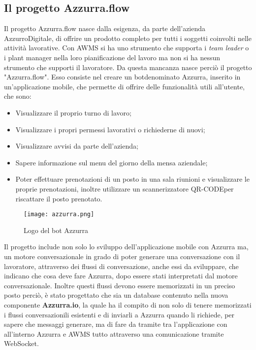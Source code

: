 \subsection{Il progetto Azzurra.flow}

Il progetto Azzurra.flow nasce dalla esigenza, da parte dell'azienda AzzurroDigitale, di offrire un prodotto completo per tutti i soggetti coinvolti nelle attività lavorative. Con \gls{AWMS} si ha uno strumento che supporta i \emph{team leader} o i \gls{plant manager} nella loro pianificazione del lavoro ma non si ha nessun strumento che supporti il lavoratore. Da questa mancanza nasce perciò il progetto "Azzurra.flow". Esso consiste nel creare un \gls{bot}\glsfirstoccur denominato Azzurra, inserito in un’applicazione mobile, che permette di offrire delle funzionalità utili all'utente, che sono:
\begin{itemize}
	\item Visualizzare il proprio turno di lavoro;
	\item Visualizzare i propri permessi lavorativi o richiederne di nuovi;
	\item Visualizzare avvisi da parte dell'azienda;
	\item Sapere informazione sul menu del giorno della mensa aziendale;
	\item Poter effettuare prenotazioni di un posto in una sala riunioni e visualizzare le proprie prenotazioni, inoltre utilizzare un scannerizzatore \gls{QR-CODE}\glsfirstoccur per riscattare il posto prenotato.
\end{itemize}
	\begin{figure}[!h] 
	\begin{center}
		\texttt{[image: azzurra.png]}
		\caption{Logo del bot Azzurra}
	\end{center}
\end{figure}
Il progetto include non solo lo sviluppo dell'applicazione mobile con Azzurra ma, un motore conversazionale in grado di poter generare una conversazione con il lavoratore, attraverso dei flussi di conversazione, anche essi da sviluppare, che indicano che cosa deve fare Azzurra, dopo essere stati interpretati dal motore conversazionale. Inoltre questi flussi devono essere memorizzati in un preciso posto perciò, è stato progettato che sia un database contenuto nella nuova componente \textbf{Azzurra.io}, la quale ha il compito di non solo di tenere memorizzati i flussi conversazionili esistenti e di inviarli a Azzurra quando li richiede, per sapere che messaggi generare, ma di fare da tramite tra l'applicazione con all'interno Azzurra e \gls{AWMS} tutto attraverso una comunicazione tramite \gls{WebSocket}\glsfirstoccur.
